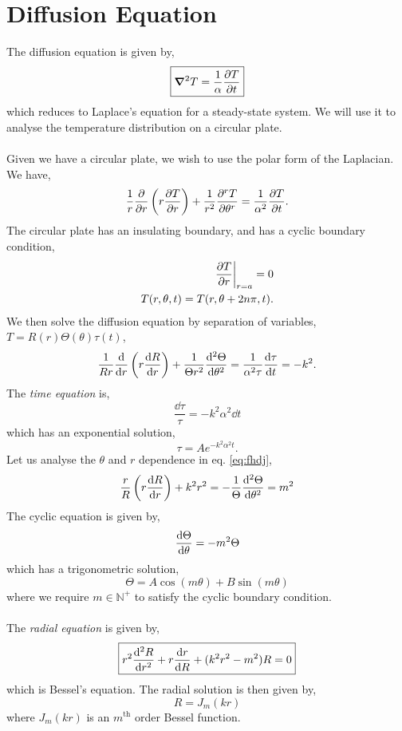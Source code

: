 \documentclass{book}
\begin{document}
\section{Diffusion Equation}
The diffusion equation is given by,
\begin{equation}
	\boxed{\grad^2T = \frac{1}{\alpha}\pdv{T}{t}}
\end{equation}
which reduces to Laplace's equation for a steady-state system. We will use it to analyse the temperature distribution on a circular plate.
\\\\
Given we have a circular plate, we wish to use the polar form of the Laplacian. We have,
\begin{equation}
	\frac{1}{r}\pdv{r}\left(r\pdv{T}{r}\right) + \frac{1}{r^2} \pdv[r]{T}{\theta} = \frac{1}{\alpha^2}\pdv{T}{t}.
\end{equation}
The circular plate has an insulating boundary, and has a cyclic boundary condition,
\begin{align}
	\eval{\pdv{T}{r}}_{r=a} = 0 \\
	T(r,\theta,t) = T(r, \theta + 2n\pi, t).
\end{align}
We then solve the diffusion equation by separation of variables, $T = R(r)\Theta(\theta)\tau(t)$,
\begin{equation}
	\frac{1}{Rr}\dv{r}\left(r\dv{R}{r}\right) + \frac{1}{\Theta r^2}\dv[2]{\Theta}{\theta} = \frac{1}{\alpha^2\tau}\dv{\tau}{t} = -k^2. \label{eq:fhdj}
\end{equation}
The \textit{time equation} is,
\begin{equation}
	\frac{\dd{\tau}}{\tau} = -k^2\alpha^2\dd{t}
\end{equation}
which has an exponential solution,
\begin{equation}
	\tau = Ae^{-k^2\alpha^2t}.
\end{equation}
Let us analyse the $\theta$ and $r$ dependence in eq. \eqref{eq:fhdj},
\begin{equation}
	\frac{r}{R}\left(r\dv{R}{r}\right) + k^2r^2 = - \frac{1}{\Theta}\dv[2]{\Theta}{\theta} = m^2
\end{equation} 
The cyclic equation is given by, 
\begin{equation}
	\dv{\Theta}{\theta} = -m^2\Theta
\end{equation}
which has a trigonometric solution,
\begin{equation}
	\Theta = A\cos(m\theta) + B\sin(m\theta)
\end{equation}
where we require $m \in \mathbb{N}^+$ to satisfy the cyclic boundary condition.
\\\\
The \textit{radial equation} is given by,
\begin{equation}
	\boxed{r^2\dv[2]{R}{r} + r\dv{r}{R} + (k^2r^2 - m^2)R = 0}
\end{equation}
which is Bessel's equation. The radial solution is then given by,
\begin{equation}
	R = J_m(kr)
\end{equation}
where $J_m(kr)$ is an $m^{\text{th}}$ order Bessel function.
\end{document}
